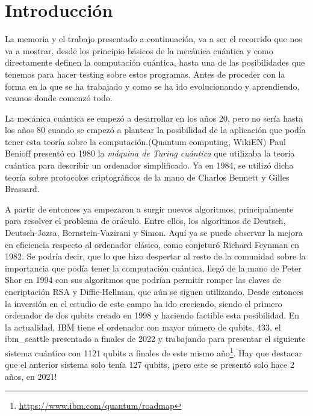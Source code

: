 \cleardoublepage

\chapter{Introducción}
\label{makereference}
La memoria y el trabajo presentado a continuación, va a ser el recorrido que nos va a mostrar, desde los principio básicos de la mecánica cuántica y como directamente definen la computación cuántica, hasta una de las posibilidades que tenemos para hacer testing sobre estos programas. Antes de proceder con la forma en la que se ha trabajado y como se ha ido evolucionando y aprendiendo, veamos donde comenzó todo. \newline

La mecánica cuántica se empezó a desarrollar en los años 20, pero no sería hasta los años 80 cuando se empezó a plantear la posibilidad de la aplicación que podía tener esta teoría sobre la computación.(Quantum computing, WikiEN) Paul Benioff presentó en 1980 la \textit{máquina de Turing cuántica} que utilizaba la teoría cuántica para describir un ordenador simplificado. Ya en 1984, se utilizó dicha teoría sobre protocolos criptográficos de la mano de Charlos Bennett y Gilles Brassard. \newline

A partir de entonces ya empezaron a surgir nuevos algoritmos, principalmente para resolver el problema de oráculo. Entre ellos, los algoritmos de Deutsch, Deutsch-Jozsa, Bernstein-Vazirani y Simon. Aquí ya se puede observar la mejora en eficiencia respecto al ordenador clásico, como conjeturó Richard Feynman en 1982. Se podría decir, que lo que hizo despertar al resto de la comunidad sobre la importancia que podía tener la computación cuántica, llegó de la mano de Peter Shor en 1994 con sus algoritmos que podrían permitir romper las claves de encriptación RSA y Diffie-Hellman, que aún se siguen utilizando. Desde entonces la inversión en el estudio de este campo ha ido creciendo, siendo el primero ordenador de dos qubits creado en 1998 y haciendo factible esta posibilidad. En la actualidad, IBM tiene el ordenador con mayor número de qubits, 433, el ibm\_seattle presentado a finales de 2022 y trabajando para presentar el siguiente sistema cuántico con 1121 qubits a finales de este mismo año\footnote{\url{https://www.ibm.com/quantum/roadmap}}. Hay que destacar que el anterior sistema solo tenía 127 qubits, ¡pero este se presentó solo hace 2 años, en 2021! \newline

